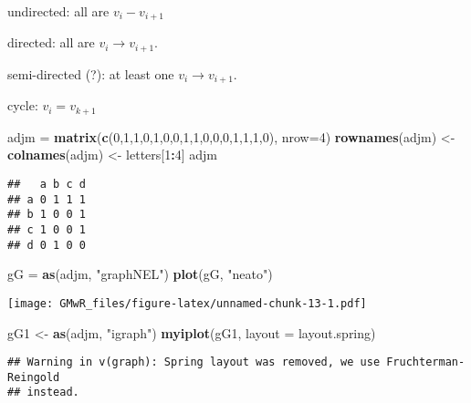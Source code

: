 \documentclass[]{article}
\newenvironment{Shaded}{\begin{snugshade}}{\end{snugshade}}
\newcommand{\KeywordTok}[1]{\textcolor[rgb]{0.13,0.29,0.53}{\textbf{#1}}}
\newcommand{\DataTypeTok}[1]{\textcolor[rgb]{0.13,0.29,0.53}{#1}}
\newcommand{\DecValTok}[1]{\textcolor[rgb]{0.00,0.00,0.81}{#1}}
\newcommand{\StringTok}[1]{\textcolor[rgb]{0.31,0.60,0.02}{#1}}
\newcommand{\OperatorTok}[1]{\textcolor[rgb]{0.81,0.36,0.00}{\textbf{#1}}}
\newcommand{\NormalTok}[1]{#1}
\begin{document}
undirected: all are \(v_i-v_{i+1}\)

directed: all are \(v_i\rightarrow v_{i+1}\).

semi-directed (?): at least one \(v_i\rightarrow v_{i+1}\).

cycle: \(v_i=v_{k+1}\)

\begin{Shaded}
\begin{Highlighting}[]
\NormalTok{adjm =}\StringTok{ }\KeywordTok{matrix}\NormalTok{(}\KeywordTok{c}\NormalTok{(}\DecValTok{0}\NormalTok{,}\DecValTok{1}\NormalTok{,}\DecValTok{1}\NormalTok{,}\DecValTok{0}\NormalTok{,}\DecValTok{1}\NormalTok{,}\DecValTok{0}\NormalTok{,}\DecValTok{0}\NormalTok{,}\DecValTok{1}\NormalTok{,}\DecValTok{1}\NormalTok{,}\DecValTok{0}\NormalTok{,}\DecValTok{0}\NormalTok{,}\DecValTok{0}\NormalTok{,}\DecValTok{1}\NormalTok{,}\DecValTok{1}\NormalTok{,}\DecValTok{1}\NormalTok{,}\DecValTok{0}\NormalTok{), }\DataTypeTok{nrow=}\DecValTok{4}\NormalTok{)}
\KeywordTok{rownames}\NormalTok{(adjm) <-}\StringTok{ }\KeywordTok{colnames}\NormalTok{(adjm) <-}\StringTok{ }\NormalTok{letters[}\DecValTok{1}\OperatorTok{:}\DecValTok{4}\NormalTok{]}
\NormalTok{adjm}
\end{Highlighting}
\end{Shaded}

\begin{verbatim}
##   a b c d
## a 0 1 1 1
## b 1 0 0 1
## c 1 0 0 1
## d 0 1 0 0
\end{verbatim}

\begin{Shaded}
\begin{Highlighting}[]
\NormalTok{gG =}\StringTok{ }\KeywordTok{as}\NormalTok{(adjm, }\StringTok{"graphNEL"}\NormalTok{)}
\KeywordTok{plot}\NormalTok{(gG, }\StringTok{"neato"}\NormalTok{)}
\end{Highlighting}
\end{Shaded}

\texttt{[image: GMwR\_files/figure-latex/unnamed-chunk-13-1.pdf]}

\begin{Shaded}
\begin{Highlighting}[]
\NormalTok{gG1 <-}\StringTok{ }\KeywordTok{as}\NormalTok{(adjm, }\StringTok{"igraph"}\NormalTok{)}
\KeywordTok{myiplot}\NormalTok{(gG1, }\DataTypeTok{layout =}\NormalTok{ layout.spring)}
\end{Highlighting}
\end{Shaded}

\begin{verbatim}
## Warning in v(graph): Spring layout was removed, we use Fruchterman-Reingold
## instead.
\end{verbatim}
\end{document}
